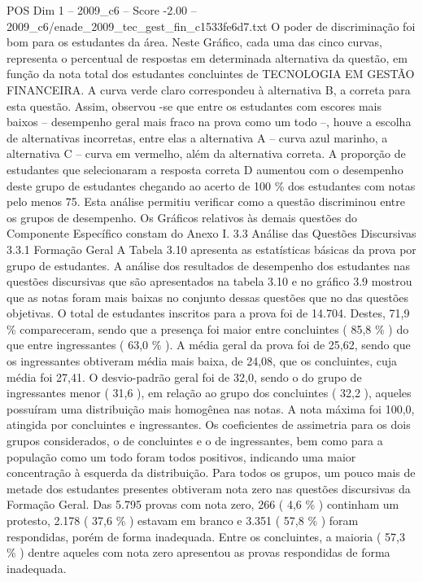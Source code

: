 \begin{textsample}{POS Dim 1 – 2009\_c6 – Score -2.00 – 2009\_c6/enade\_2009\_tec\_gest\_fin\_c1533fe6d7.txt}
O poder de discriminação foi bom para os estudantes da área.
Neste Gráfico, cada uma das cinco curvas, representa o percentual de respostas em determinada alternativa da questão, em função da nota total dos estudantes concluintes de TECNOLOGIA EM GESTÃO FINANCEIRA.
A curva verde claro correspondeu à alternativa B, a correta para esta questão.
Assim, observou -se que entre os estudantes com escores mais baixos – desempenho geral mais fraco na prova como um todo –, houve a escolha de alternativas incorretas, entre elas a alternativa A – curva azul marinho, a alternativa C – curva em vermelho, além da alternativa correta.
A proporção de estudantes que selecionaram a resposta correta D aumentou com o desempenho deste grupo de estudantes chegando ao acerto de 100 \% dos estudantes com notas pelo menos 75.
Esta análise permitiu verificar como a questão discriminou entre os grupos de desempenho.
Os Gráficos relativos às demais questões do Componente Específico constam do Anexo I. 3.3 Análise das Questões Discursivas 3.3.1 Formação Geral A Tabela 3.10 apresenta as estatísticas básicas da prova por grupo de estudantes.
A análise dos resultados de desempenho dos estudantes nas questões discursivas que são apresentados na tabela 3.10 e no gráfico 3.9 mostrou que as notas foram mais baixas no conjunto dessas questões que no das questões objetivas.
O total de estudantes inscritos para a prova foi de 14.704.
Destes, 71,9 \% compareceram, sendo que a presença foi maior entre concluintes ( 85,8 \% ) do que entre ingressantes ( 63,0 \% ).
A média geral da prova foi de 25,62, sendo que os ingressantes obtiveram média mais baixa, de 24,08, que os concluintes, cuja média foi 27,41.
O desvio-padrão geral foi de 32,0, sendo o do grupo de ingressantes menor ( 31,6 ), em relação ao grupo dos concluintes ( 32,2 ), aqueles possuíram uma distribuição mais homogênea nas notas.
A nota máxima foi 100,0, atingida por concluintes e ingressantes.
Os coeficientes de assimetria para os dois grupos considerados, o de concluintes e o de ingressantes, bem como para a população como um todo foram todos positivos, indicando uma maior concentração à esquerda da distribuição.
Para todos os grupos, um pouco mais de metade dos estudantes presentes obtiveram nota zero nas questões discursivas da Formação Geral.
Das 5.795 provas com nota zero, 266 ( 4,6 \% ) continham um protesto, 2.178 ( 37,6 \% ) estavam em branco e 3.351 ( 57,8 \% ) foram respondidas, porém de forma inadequada.
Entre os concluintes, a maioria ( 57,3 \% ) dentre aqueles com nota zero apresentou as provas respondidas de forma inadequada.

\end{textsample}
